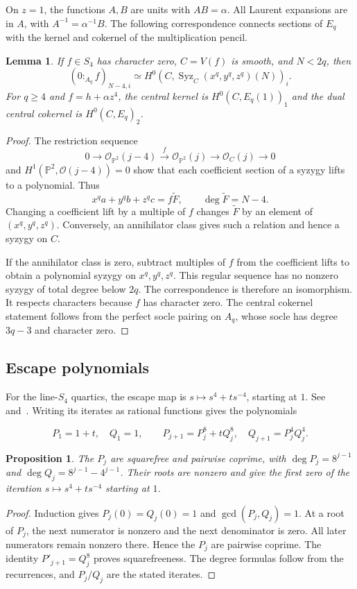 \documentclass[11pt,a4paper,reqno]{amsart}
\numberwithin{equation}{section}
\theoremstyle{plain}
\newtheorem{lemma}[theorem]{Lemma}
\newtheorem{proposition}[theorem]{Proposition}
\theoremstyle{definition}
\theoremstyle{remark}
\DeclareMathOperator{\Syz}{Syz}
\begin{document}
On $z=1$, the functions $A,B$ are units with $AB=\alpha$.
All Laurent expansions are in $A$, with $A^{-1}=\alpha^{-1}B$.
The following correspondence connects sections of $E_q$ with the
kernel and cokernel of the multiplication pencil.
\begin{lemma}\label{lem:ann-syz}
If $f\in S_4$ has character zero, $C=V(f)$ is smooth, and $N<2q$, then
\[
(0:_{A_q}f)_{N-4,i}\simeq
H^0(C,\Syz_C(x^q,y^q,z^q)(N))_i.
\]
For $q\geq4$ and $f=h+\alpha z^4$, the central kernel is $H^0(C,E_q(1))_1$ and
the dual central cokernel is $H^0(C,E_q)_2$.
\end{lemma}
\begin{proof}
The restriction sequence
\[
0\longrightarrow\mathcal O_{\mathbb P^2}(j-4)
\xrightarrow{\,f\,}\mathcal O_{\mathbb P^2}(j)
\longrightarrow\mathcal O_C(j)\longrightarrow0
\]
and $H^1(\mathbb P^2,\mathcal O(j-4))=0$ show that each coefficient
section of a syzygy lifts to a polynomial. Thus
\[
x^qa+y^qb+z^qc=f\widetilde F,
\qquad \deg\widetilde F=N-4.
\]
Changing a coefficient lift by a multiple of $f$ changes
$\widetilde F$ by an element of $(x^q,y^q,z^q)$.
Conversely, an annihilator class gives such a relation and hence a
syzygy on $C$.

If the annihilator class is zero, subtract multiples of $f$ from the
coefficient lifts to obtain a polynomial syzygy on $x^q,y^q,z^q$.
This regular sequence has no nonzero syzygy of total degree below $2q$.
The correspondence is therefore an isomorphism. It respects characters
because $f$ has character zero. The central cokernel statement follows
from the perfect socle pairing on $A_q$, whose socle has degree $3q-3$
and character zero.
\end{proof}
\subsection{Escape polynomials}
For the line-$S_4$ quartics, the escape map is
$s\mapsto s^4+ts^{-4}$, starting at $1$.
See~\cite[Definitions 2.1--2.2]{Borevitz} and~\cite[Theorem 5.10]{Monsky}.
Writing its iterates as rational functions gives the polynomials

\[
P_1=1+t,\quad Q_1=1,\qquad
P_{j+1}=P_j^8+tQ_j^8,\quad Q_{j+1}=P_j^4Q_j^4.
\]
\begin{proposition}\label{prop:escape}
The $P_j$ are squarefree and pairwise coprime, with
$\deg P_j=8^{j-1}$ and $\deg Q_j=8^{j-1}-4^{j-1}$.
Their roots are nonzero and give the first zero of the iteration
$s\mapsto s^4+ts^{-4}$ starting at $1$.
\end{proposition}
\begin{proof}
Induction gives $P_j(0)=Q_j(0)=1$ and $\gcd(P_j,Q_j)=1$.
At a root of $P_j$, the next numerator is nonzero and the next
denominator is zero. All later numerators remain nonzero there.
Hence the $P_j$ are pairwise coprime.
The identity $P'_{j+1}=Q_j^8$ proves squarefreeness.
The degree formulas follow from the recurrences, and
$P_j/Q_j$ are the stated iterates.
\end{proof}
\end{document}
